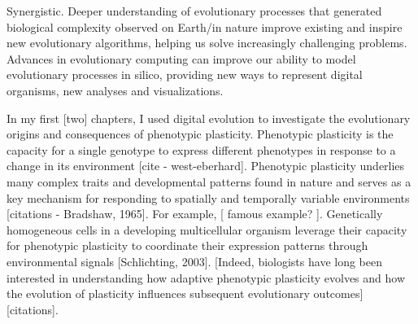 Synergistic.
Deeper understanding of evolutionary processes that generated biological complexity observed on Earth/in nature improve existing and inspire new evolutionary algorithms, helping us solve increasingly challenging problems.
Advances in evolutionary computing can improve our ability to model evolutionary processes in silico, providing new ways to represent digital organisms, new analyses and visualizations. 

In my first [two] chapters, I used digital evolution to investigate the evolutionary origins and consequences of phenotypic plasticity.
Phenotypic plasticity is the capacity for a single genotype to express different phenotypes in response to a change in its environment [cite - west-eberhard].
Phenotypic plasticity underlies many complex traits and developmental patterns found in nature and serves as a key mechanism for responding to spatially and temporally variable environments [citations - Bradshaw, 1965].
For example, [ famous example? ].
Genetically homogeneous cells in a developing multicellular organism leverage their capacity for phenotypic plasticity to coordinate their expression patterns through environmental signals [Schlichting, 2003].
[Indeed, biologists have long been interested in understanding how adaptive phenotypic plasticity evolves and how the evolution of plasticity influences subsequent evolutionary outcomes] [citations].
















